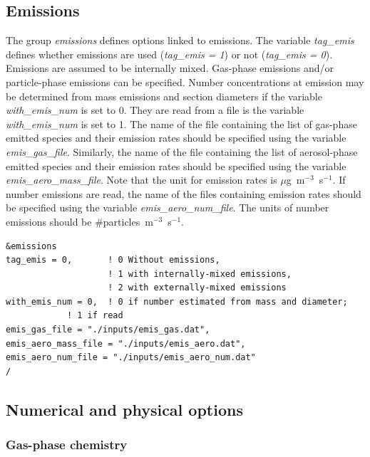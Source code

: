\documentclass[a4paper,11pt]{article}
\begin{document}
\subsection{Emissions}

The group {\textit{emissions}} defines options linked to emissions. The variable {\textit{tag\_emis}} defines whether emissions are used ({\textit{tag\_emis = 1}}) or not ({\textit{tag\_emis = 0}}).
Emissions are assumed to be internally mixed. Gas-phase emissions and/or particle-phase emissions can be specified. Number concentrations at emission may be determined from mass emissions and section diameters if the variable {\textit{with\_emis\_num}} is set to 0. They are read from a file is the variable {\textit{with\_emis\_num}} is set to 1. 
The name of the file containing the list of gas-phase emitted species and their emission rates should be specified using the variable {\textit{emis\_gas\_file}}. Similarly, the name of the file containing the list of aerosol-phase emitted species and their emission rates should be specified using the variable {\textit{emis\_aero\_mass\_file}}. Note that the unit for emission rates is $\mu$g~m$^{-3}$~s$^{-1}$. If number emissions are read, the name of the files containing emission rates should be specified using the variable {\textit{emis\_aero\_num\_file}}. The units of number emissions should be \#particles~m$^{-3}$~s$^{-1}$.

\begin{verbatim}
&emissions
tag_emis = 0,       ! 0 Without emissions, 
                    ! 1 with internally-mixed emissions, 
                    ! 2 with externally-mixed emissions  
with_emis_num = 0,  ! 0 if number estimated from mass and diameter; 
		    ! 1 if read
emis_gas_file = "./inputs/emis_gas.dat",
emis_aero_mass_file = "./inputs/emis_aero.dat", 
emis_aero_num_file = "./inputs/emis_aero_num.dat" 
/
\end{verbatim}


\subsection{Numerical and physical options}

\subsubsection{Gas-phase chemistry}
\end{document}
